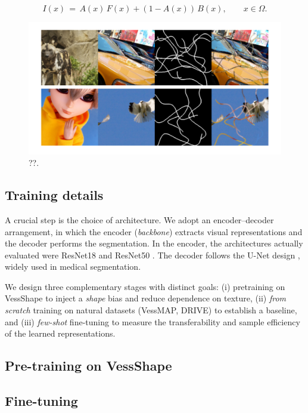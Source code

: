 \documentclass[%
reprint,
nofootinbib,
 amsmath,amssymb,
aps,
superscriptaddress,
showkeys,
longbibliography
]{revtex4-1}
\begin{document}
\begin{equation}
I(x) \,=\, A(x)\,F(x) + (1-A(x))\,B(x), \qquad x \in \Omega.
\label{eq:compose}
\end{equation}


\begin{figure}[tbp]
    \centering
    \includegraphics[width=\textwidth]{figures/results/vess-shape_sample.pdf}
    \caption{??.}
    \label{f:vess-shape_sample}
\end{figure}


\subsection{Training details}

A crucial step is the choice of architecture. We adopt an encoder–decoder arrangement, in which the encoder (\emph{backbone}) extracts visual representations and the decoder performs the segmentation. In the encoder, the architectures actually evaluated were ResNet18 and ResNet50 \cite{}. The decoder follows the U-Net design \cite{}, widely used in medical segmentation.

We design three complementary stages with distinct goals: (i) pretraining on VessShape to inject a \emph{shape} bias and reduce dependence on texture, (ii) \emph{from scratch} training on natural datasets (VessMAP, DRIVE) to establish a baseline, and (iii) \emph{few-shot} fine-tuning to measure the transferability and sample efficiency of the learned representations.

\subsection{Pre-training on VessShape}




\subsection{Fine-tuning}
\end{document}
